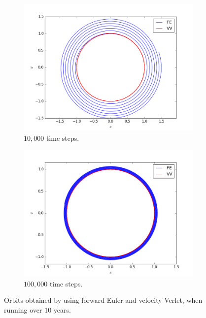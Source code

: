 \documentclass[12pt, a4paper]{article}
\begin{document}
\begin{figure}
\centering
  	\begin{subfigure}[b]{1\textwidth}
	\includegraphics[scale=0.65]{../Programs/Output/FE_vs_VV_n=10000.png}
	\caption{$10,000$ time steps.}
	\end{subfigure} 	
  	\begin{subfigure}[b]{1\textwidth}
	\includegraphics[scale=0.65]{../Programs/Output/FE_vs_VV_n=100000.png}
	\caption{$100,000$ time steps.}	
	\end{subfigure} 	
\caption{Orbits obtained by using forward Euler and velocity Verlet, when running over $10$ years.}
\label{fig:FE_vs_VV}
\end{figure} 
\end{document}
